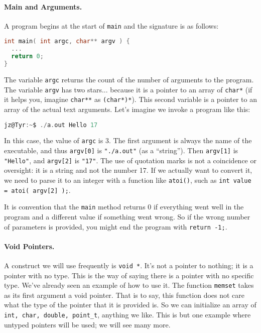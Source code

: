 \paragraph{Main and Arguments.}
A program begins at the start of \texttt{main} and the signature is as follows:

\begin{lstlisting}[language=C]
int main( int argc, char** argv ) {
  ...
  return 0;
}
\end{lstlisting}

The variable \texttt{argc} returns the count of the number of arguments to the program. The variable \texttt{argv} has two stars... because it is a pointer to an array of \texttt{char*} (if it helps you, imagine \texttt{char**} as \texttt{(char*)*}). This second variable is a pointer to an array of the actual text arguments. Let's imagine we invoke a program like this:

\begin{lstlisting}[language=C]
jz@Tyr:~$ ./a.out Hello 17
\end{lstlisting}

In this case, the value of \texttt{argc} is 3. The first argument is always the name of the executable, and thus \texttt{argv[0]} is \texttt{"./a.out"} (as a ``string''). Then \texttt{argv[1]} is \texttt{"Hello"}, and \texttt{argv[2]} is \texttt{"17"}.  The use of quotation marks is not a coincidence or oversight: it is a string and not the number 17. If we actually want to convert it, we need to parse it to an integer with a function like \texttt{atoi()}, such as \texttt{int value = atoi( argv[2] );}.

It is convention that the \texttt{main} method returns 0 if everything went well in the program and a different value if something went wrong. So if the wrong number of parameters is provided, you might end the program with \texttt{return -1;}.



\paragraph{Void Pointers.}

A construct we will use frequently is \texttt{void *}. It's not a pointer to nothing; it is a pointer with no type. This is the way of saying there is a pointer with no specific type. We've already seen an example of how to use it. The function \texttt{memset} takes as its first argument a void pointer. That is to say, this function does not care what the type of the pointer that it is provided is. So we can initialize an array of \texttt{int, char, double, point\_t}, anything we like. This is but one example where untyped pointers will be used; we will see many more.

